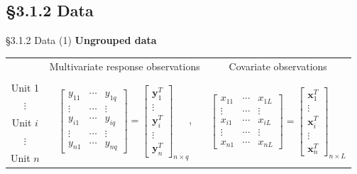 \documentclass{beamer}
\newcommand{\currentsubsection}{}
\let\oldsubsection\subsection
\renewcommand{\subsection}[1]{\oldsubsection{#1}\renewcommand{\currentsubsection}{#1}}
\begin{document}
\subsection{\S3.1.2 Data}
\begin{frame}{\S3.1.2 Data (1)}
\noindent
\textbf{Ungrouped data}
{\small 
\begin{center}
\begin{tabular}{ccc}
& Multivariate response  observations & Covariate observations  \\ \\
Unit 1 &  \multirow{5}{*}{$\left[\begin{array}{ccc} y_{11} & \cdots & y_{1q} \\
\vdots & \cdots & \vdots \\ y_{i1} & \cdots & y_{iq} \\ \vdots & \cdots & \vdots \\ 
y_{n1} & \cdots & y_{nq} \end{array}\right]
=\left[\begin{array}{c} \textbf{y}_1^T \\ \vdots \\ \textbf{y}_i^T \\ \vdots 
\\ \textbf{y}_n^T\end{array}\right]_{n\times q}$,} & 
\multirow{5}{*}{$\left[\begin{array}{ccc} x_{11} & \cdots & x_{1L} \\ 
\vdots & \cdots & \vdots \\ x_{i1} & \cdots & x_{iL} \\ \vdots & \cdots & \vdots \\ x_{n1} & \cdots & x_{nL}
\end{array}\right]=\left[\begin{array}{c} \textbf{x}_1^T \\ \vdots \\ \textbf{x}_i^T \\ \vdots 
\\ \textbf{x}_n^T\end{array}\right]_{n\times L}$} \\ $\vdots$ & & \\ Unit $i$ & & \\ $\vdots$ & & \\ Unit $n$ & &
\end{tabular}
\end{center}}
\end{frame}
\end{document}
